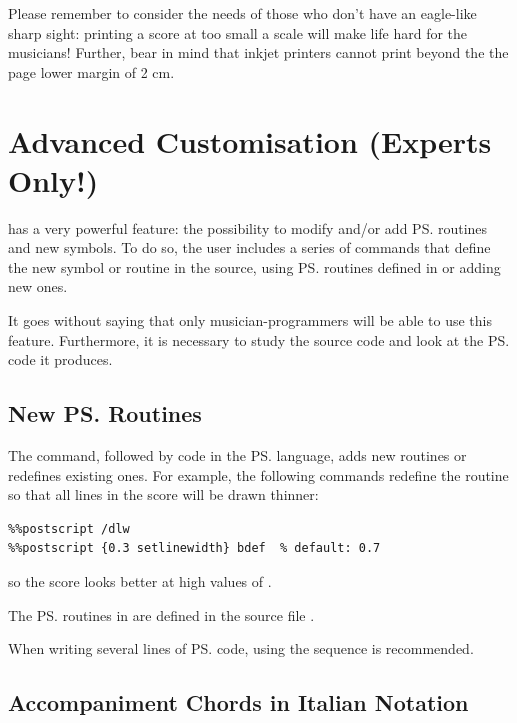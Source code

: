 \documentclass[a4paper,fullpage,12pt]{book}
\begin{document}
Please remember to consider the needs of those who don't have an
eagle-like sharp sight: printing a score at too small a scale will
make life hard for the musicians! Further, bear in mind that inkjet
printers cannot print beyond the the page lower margin of 2 cm.


\section{Advanced Customisation (Experts Only!)}
\label{sec:decopers}

\abcm{} has a very powerful feature: the possibility to modify and/or
add \ps{} routines and new symbols. To do so, the user includes a
series of commands that define the new symbol or routine in the
source, using \ps{} routines defined in \abcm{} or adding new ones.

It goes without saying that only musician-programmers will be able to
use this feature. Furthermore, it is necessary to study the \abcm{}
source code and look at the \ps{} code it produces.


\subsection{New \ps{} Routines}

The  command, followed by code in the \ps{}
language, adds new routines or redefines existing ones. For example,
the following commands redefine the routine  so that all
lines in the score will be drawn thinner:

\begin{verbatim}
%%postscript /dlw
%%postscript {0.3 setlinewidth} bdef  % default: 0.7
\end{verbatim}

so the score looks better at high values of .

The \ps{} routines in \abcm{} are defined in the \abcm{} source file
.

When writing several lines of \ps{} code, using the sequence
  is recommended.


\subsection{Accompaniment Chords in Italian Notation}
\label{sec:itachords}
\end{document}
